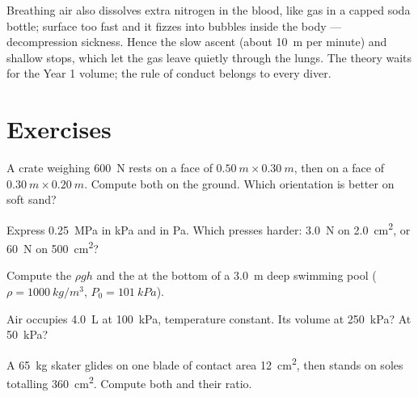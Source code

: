 \begin{remark}[Decompression]\label{rem:g10:pressure:deco}
Breathing  air also dissolves extra nitrogen in the blood,
like gas in a capped soda bottle; surface too fast and it fizzes into
bubbles inside the body --- decompression sickness. Hence the slow
ascent (about \qty{10}{m} per minute) and shallow stops, which let the
gas leave quietly through the lungs. The theory waits for the Year 1
volume; the rule of conduct belongs to every diver.
\end{remark}

\section{Exercises}

\begin{exercise}[$\star$]\label{exo:g10:pressure:1}
A crate weighing \qty{600}{N} rests on a face of
$\qty{0.50}{m} \times \qty{0.30}{m}$, then on a face of
$\qty{0.30}{m} \times \qty{0.20}{m}$. Compute both  on the
ground. Which orientation is better on soft sand?
\end{exercise}

\begin{exercise}[$\star$]\label{exo:g10:pressure:2}
Express \qty{0.25}{MPa} in \unit{kPa} and in \unit{Pa}. Which presses
harder: \qty{3.0}{N} on \qty{2.0}{cm^2}, or \qty{60}{N} on
\qty{500}{cm^2}?
\end{exercise}

\begin{exercise}[$\star$]\label{exo:g10:pressure:3}
Compute the  $\rho g h$ and the  at the
bottom of a \qty{3.0}{m} deep swimming pool
($\rho = \qty{1000}{kg/m^3}$, $P_0 = \qty{101}{kPa}$).
\end{exercise}

\begin{exercise}[$\star$]\label{exo:g10:pressure:4}
Air occupies \qty{4.0}{L} at \qty{100}{kPa}, temperature constant.
Its volume at \qty{250}{kPa}? At \qty{50}{kPa}?
\end{exercise}

\begin{exercise}[$\star$]\label{exo:g10:pressure:5}
A \qty{65}{kg} skater glides on one blade of contact area
\qty{12}{cm^2}, then stands on soles totalling \qty{360}{cm^2}.
Compute both  and their ratio.
\end{exercise}

